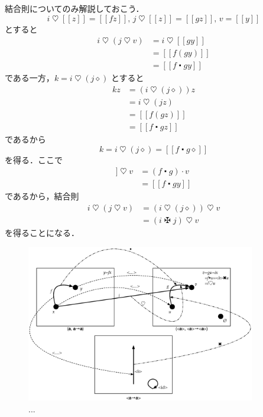 \documentclass[a5paper,twoside,fleqn,draft]{jsbook}
\def\[{[\![}
\def\]{]\!]}
\newcommand{\mAnonParam}{\diamond}
\DeclareMathOperator{\mBind}{\heartsuit}
\DeclareMathOperator{\mBindComp}{\maltese}
\DeclareMathOperator{\mComp}{\centerdot}
\DeclareMathOperator{\mMap}{\cdot}
\newcommand{\mPureWith}[1]{\[#1\]}
\begin{document}
結合則についてのみ解説しておこう．
\begin{equation}
i\mBind\mPureWith{z}=\mPureWith{fz},\,
j\mBind\mPureWith{z}=\mPureWith{gz},\,
v=\mPureWith{y}
\end{equation}
とすると
\begin{align}
i\mBind(j\mBind v)&=i\mBind\mPureWith{gy}\\
&=\mPureWith{f(gy)}\\
&=\mPureWith{f\mComp gy}
\end{align}
である一方，$k=i\mBind{}(j\mAnonParam)$ とすると
\begin{align}
kz&=(i\mBind(j\mAnonParam))z\\
&=i\mBind(jz)\\
&=\mPureWith{f(gz)}\\
&=\mPureWith{f\mComp gz}
\end{align}
であるから
\begin{equation}
k=i\mBind{}(j\mAnonParam)=\mPureWith{f\mComp g\mAnonParam}
\end{equation}
を得る．ここで
\begin{align}
\mPureWith{f\mComp g\mAnonParam}\mBind v
&=(f\mComp g)\mMap v\\
&=\mPureWith{f\mComp gy}
\end{align}
であるから，結合則
\begin{align}
  i\mBind{}(j\mBind v)
  &=(i\mBind{}(j\mAnonParam))\mBind v\\
  &=(i\mBindComp j)\mBind v
\end{align}
を得ることになる．

\begin{figure}
\begin{center}
\includegraphics[width=100mm]{fig/functor.eps}
\end{center}
\caption{...}
\label{fig:functor}
\end{figure}
\end{document}
